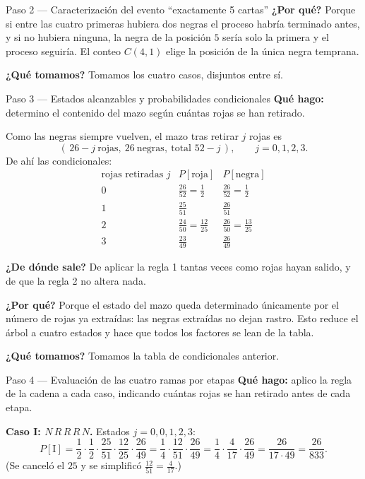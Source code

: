 \documentclass[11pt]{article}
\begin{document}
\begin{sol}
\begin{paso}{Paso 2 --- Caracterizaci\'on del evento ``exactamente 5 cartas''}
\textbf{¿Por qu\'e?} Porque si entre las cuatro primeras hubiera dos negras el proceso habr\'ia terminado antes, y si no hubiera ninguna, la negra de la posici\'on $5$ ser\'ia solo la primera y el proceso seguir\'ia. El conteo $C(4,1)$ elige la posici\'on de la \'unica negra temprana.

\textbf{¿Qu\'e tomamos?} Tomamos los cuatro casos, disjuntos entre s\'i.
\end{paso}

\begin{paso}{Paso 3 --- Estados alcanzables y probabilidades condicionales}
\textbf{Qu\'e hago:} determino el contenido del mazo seg\'un cu\'antas rojas se han retirado.

Como las negras siempre vuelven, el mazo tras retirar $j$ rojas es
\[
(\,26-j\ \text{rojas},\ 26\ \text{negras},\ \text{total } 52-j\,),
\qquad j=0,1,2,3 .
\]
De ah\'i las condicionales:
\[
\begin{array}{c|c|c}
\text{rojas retiradas } j & P[\text{roja}] & P[\text{negra}]\\\hline
0 & \frac{26}{52}=\frac{1}{2} & \frac{26}{52}=\frac{1}{2}\\[3pt]
1 & \frac{25}{51} & \frac{26}{51}\\[3pt]
2 & \frac{24}{50}=\frac{12}{25} & \frac{26}{50}=\frac{13}{25}\\[3pt]
3 & \frac{23}{49} & \frac{26}{49}
\end{array}
\]

\textbf{¿De d\'onde sale?} De aplicar la regla 1 tantas veces como rojas hayan salido, y de que la regla 2 no altera nada.

\textbf{¿Por qu\'e?} Porque el estado del mazo queda determinado \'unicamente por el n\'umero de rojas ya extra\'idas: las negras extra\'idas no dejan rastro. Esto reduce el \'arbol a cuatro estados y hace que todos los factores se lean de la tabla.

\textbf{¿Qu\'e tomamos?} Tomamos la tabla de condicionales anterior.
\end{paso}

\begin{paso}{Paso 4 --- Evaluaci\'on de las cuatro ramas por etapas}
\textbf{Qu\'e hago:} aplico la regla de la cadena a cada caso, indicando cu\'antas rojas se han retirado antes de cada etapa.

\textbf{Caso I: $N\,R\,R\,R\,N$.} Estados $j=0,0,1,2,3$:
\[
P[\text{I}]=\frac{1}{2}\cdot\frac{1}{2}\cdot\frac{25}{51}\cdot\frac{12}{25}\cdot\frac{26}{49}
=\frac{1}{4}\cdot\frac{12}{51}\cdot\frac{26}{49}
=\frac{1}{4}\cdot\frac{4}{17}\cdot\frac{26}{49}
=\frac{26}{17\cdot 49}=\frac{26}{833}.
\]
(Se cancel\'o el $25$ y se simplific\'o $\frac{12}{51}=\frac{4}{17}$.)


\end{paso}
\end{sol}
\end{document}
